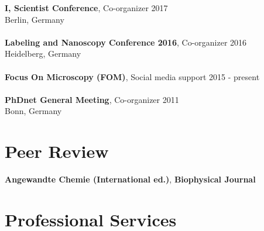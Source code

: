 \documentclass[margin,line]{res}
\begin{document}
\begin{resume}
{\bf I, Scientist Conference},  Co-organizer \hfill {2017}\\
Berlin, Germany\\
\vspace*{-3mm}\\
{\bf Labeling and Nanoscopy Conference 2016}, Co-organizer \hfill {2016}\\
Heidelberg, Germany\\
\vspace*{-3mm}\\
{\bf Focus On Microscopy (FOM)}, Social media support \hfill {2015 - present}\\
\vspace*{-3mm}\\
{\bf PhDnet General Meeting}, Co-organizer \hfill {2011}\\
Bonn, Germany


\section{\sc Peer Review} 
{\bf Angewandte Chemie (International ed.)}, {\bf Biophysical Journal}


\section{\sc Professional Services}



\end{resume}
\end{document}
